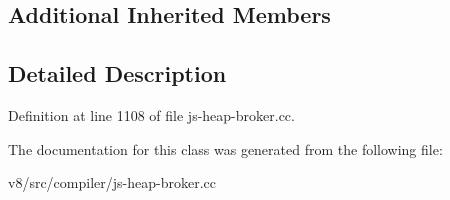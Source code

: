 \subsection*{Additional Inherited Members}


\subsection{Detailed Description}


Definition at line 1108 of file js-\/heap-\/broker.\+cc.



The documentation for this class was generated from the following file\+:\begin{DoxyCompactItemize}
\item 
v8/src/compiler/js-\/heap-\/broker.\+cc\end{DoxyCompactItemize}
